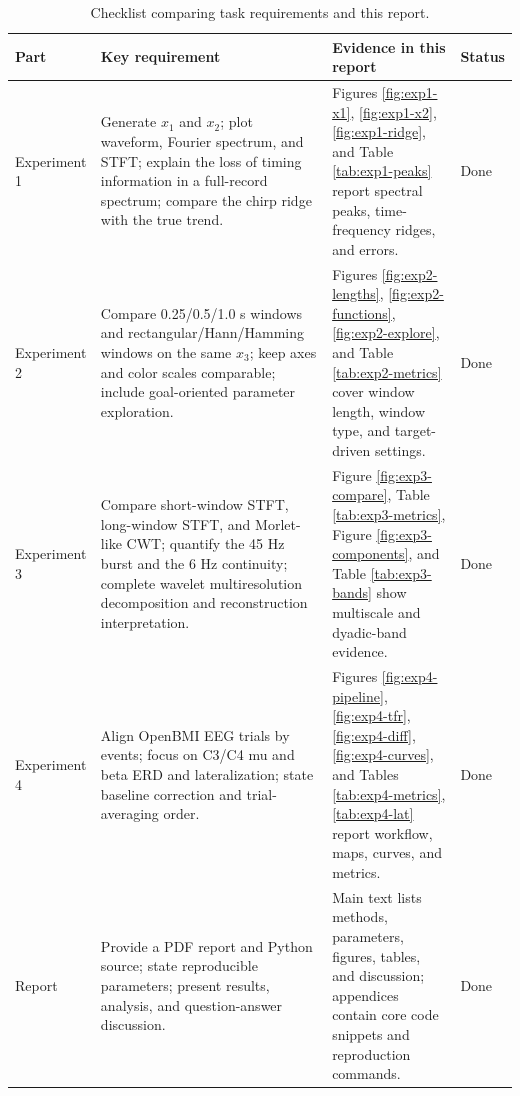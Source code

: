 \documentclass[a4paper,11pt]{article}
\numberwithin{equation}{section}
\begin{document}
\begin{table}[H]
\centering
\caption{Checklist comparing task requirements and this report.}
\label{tab:task-coverage}
\scriptsize
\renewcommand{\arraystretch}{1.18}
\setlength{\tabcolsep}{2.5pt}
\begin{tabular}{@{}p{}p{}p{}p{}@{}}
\toprule
Part & Key requirement & Evidence in this report & Status\\
\midrule
Experiment 1 & Generate $x_1$ and $x_2$; plot waveform, Fourier spectrum, and STFT; explain the loss of timing information in a full-record spectrum; compare the chirp ridge with the true trend. & Figures \ref{fig:exp1-x1}, \ref{fig:exp1-x2}, \ref{fig:exp1-ridge}, and Table \ref{tab:exp1-peaks} report spectral peaks, time-frequency ridges, and errors. & Done\\
Experiment 2 & Compare 0.25/0.5/1.0 s windows and rectangular/Hann/Hamming windows on the same $x_3$; keep axes and color scales comparable; include goal-oriented parameter exploration. & Figures \ref{fig:exp2-lengths}, \ref{fig:exp2-functions}, \ref{fig:exp2-explore}, and Table \ref{tab:exp2-metrics} cover window length, window type, and target-driven settings. & Done\\
Experiment 3 & Compare short-window STFT, long-window STFT, and Morlet-like CWT; quantify the 45 Hz burst and the 6 Hz continuity; complete wavelet multiresolution decomposition and reconstruction interpretation. & Figure \ref{fig:exp3-compare}, Table \ref{tab:exp3-metrics}, Figure \ref{fig:exp3-components}, and Table \ref{tab:exp3-bands} show multiscale and dyadic-band evidence. & Done\\
Experiment 4 & Align OpenBMI EEG trials by events; focus on C3/C4 mu and beta ERD and lateralization; state baseline correction and trial-averaging order. & Figures \ref{fig:exp4-pipeline}, \ref{fig:exp4-tfr}, \ref{fig:exp4-diff}, \ref{fig:exp4-curves}, and Tables \ref{tab:exp4-metrics}, \ref{tab:exp4-lat} report workflow, maps, curves, and metrics. & Done\\
Report & Provide a PDF report and Python source; state reproducible parameters; present results, analysis, and question-answer discussion. & Main text lists methods, parameters, figures, tables, and discussion; appendices contain core code snippets and reproduction commands. & Done\\
\bottomrule
\end{tabular}
\end{table}
\end{document}
